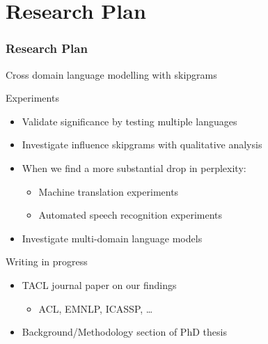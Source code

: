 \documentclass[11pt,t]{beamer}
\begin{document}
\section{Research Plan}
\begin{frame}
    \frametitle{Research Plan}

             Cross domain language modelling with skipgrams

    \begin{block}{Experiments}
        \begin{itemize}
            \item Validate significance by testing multiple languages
            \item Investigate influence skipgrams with qualitative analysis
            \item When we find a more substantial drop in perplexity:
                \begin{itemize}
                    \item Machine translation experiments
                    \item Automated speech recognition experiments
                \end{itemize}
            \item Investigate multi-domain language models
        \end{itemize}
    \end{block}

    \begin{block}{Writing in progress}
        \begin{itemize}
            \item TACL journal paper on our findings
                \begin{itemize}
                    \item ACL, EMNLP, ICASSP, \ldots
                \end{itemize}
            \item Background/Methodology section of PhD thesis
        \end{itemize}
    \end{block}
\end{frame}
\end{document}
